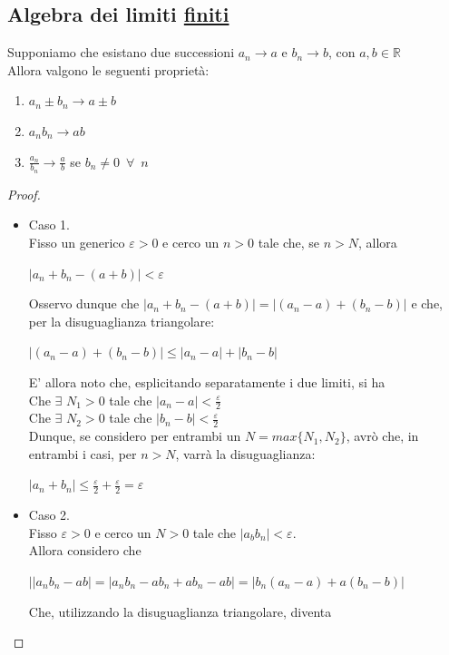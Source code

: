 \documentclass{article}
\theoremstyle{definition}
\begin{document}
\subsection{Algebra dei limiti \underline{finiti}}
Supponiamo che esistano due successioni $a_n \longrightarrow a$ e $b_n \longrightarrow b$, con $a,b \in \mathbb{R}$
\\
Allora valgono le seguenti proprietà:
\begin{enumerate}
    \item $a_n \pm b_n \longrightarrow a \pm b$
    \item $a_nb_n \longrightarrow ab$
    \item $\frac{a_n}{b_n} \longrightarrow \frac{a}{b}$ se $b_n \neq 0 \,\,\, \forall \,\,\, n$
\end{enumerate}
\begin{proof}
\begin{itemize}
    \item Caso 1.
    \\
    Fisso un generico $\varepsilon>0$ e cerco un $n>0$ tale che, se $n>N$, allora
    \begin{center}
        $|a_n+b_n-(a+b)|<\varepsilon$
    \end{center}
Osservo dunque che $|a_n+b_n-(a+b)|=|(a_n-a)+(b_n-b)|$ e che, per la disuguaglianza triangolare:
\begin{center}
    $|(a_n-a)+(b_n-b)|\leqslant |a_n-a|+|b_n-b|$
\end{center}
E' allora noto che, esplicitando separatamente i due limiti, si ha
\\
Che $\exists$ $N_1>0$ tale che $|a_n-a|<\frac{\varepsilon}{2}$
\\
Che $\exists$ $N_2>0$ tale che $|b_n-b|<\frac{\varepsilon}{2}$
\\
Dunque, se considero per entrambi un $N=max\{N_1,N_2\}$, avrò che, in entrambi i casi, per $n>N$, varrà la disuguaglianza:
\begin{center}
    $|a_n+b_n|\leqslant \frac{\varepsilon}{2}+\frac{\varepsilon}{2}=\varepsilon$
\end{center}
\item Caso 2.
\\
Fisso $\varepsilon>0$ e cerco un $N>0$ tale che $|a_bb_n|< \varepsilon$.\\
Allora considero che
\begin{center}
    $||a_nb_n-ab|=|a_nb_n-ab_n+ab_n-ab|=|b_n(a_n-a)+a(b_n-b)|$
\end{center}
Che, utilizzando la disuguaglianza triangolare, diventa

\end{itemize}
\end{proof}
\end{document}
